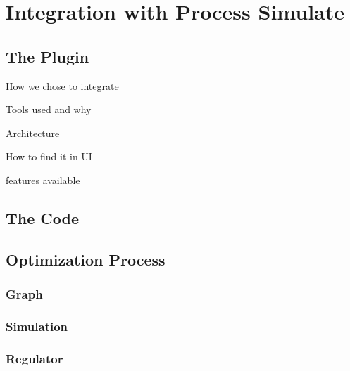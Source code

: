 \chapter{Integration with Process Simulate}
\label{ch:integration}
\graphicspath{{chapters/Integration/}}

\section{The Plugin}

How we chose to integrate

Tools used and why

Architecture

How to find it in UI

features available

\section{The Code}

\section{Optimization Process}

\subsection{Graph}
\subsection{Simulation}
\subsection{Regulator}
